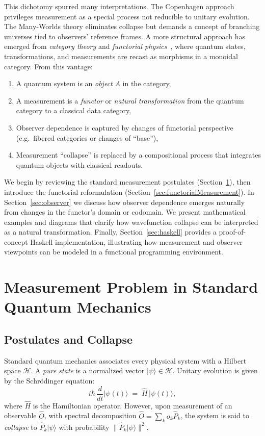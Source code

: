 \documentclass[12pt]{article}
\begin{document}
This dichotomy spurred many interpretations. The Copenhagen approach privileges measurement as a special process 
not reducible to unitary evolution. The Many-Worlds theory eliminates collapse but demands a concept of branching 
universes tied to observers' reference frames. A more structural approach has emerged from \emph{category theory} and 
\emph{functorial physics}~\cite{AbramskyCoecke, HeunenVicary}, where quantum states, transformations, and measurements 
are recast as morphisms in a monoidal category. From this vantage:
\begin{enumerate}[label=(\roman*)]
    \item A quantum system is an \emph{object} \(A\) in the category,
    \item A measurement is a \emph{functor} or \emph{natural transformation} from the quantum category to a classical data category,
    \item Observer dependence is captured by changes of functorial perspective (e.g.\ fibered categories or changes of ``base''),
    \item Measurement ``collapse'' is replaced by a compositional process that integrates quantum objects with classical readouts.
\end{enumerate}

We begin by reviewing the standard measurement postulates (Section~\ref{sec:measurementProblem}), 
then introduce the functorial reformulation (Section~\ref{sec:functorialMeasurement}). 
In Section~\ref{sec:observer} we discuss how observer dependence emerges naturally from changes in the functor's domain or codomain. 
We present mathematical examples and diagrams that clarify how wavefunction collapse can be interpreted as a natural transformation. 
Finally, Section~\ref{sec:haskell} provides a proof-of-concept Haskell implementation, illustrating how measurement 
and observer viewpoints can be modeled in a functional programming environment.

\section{Measurement Problem in Standard Quantum Mechanics}
\label{sec:measurementProblem}

\subsection{Postulates and Collapse}
Standard quantum mechanics associates every physical system with a Hilbert space \(\mathcal{H}\). 
A \emph{pure state} is a normalized vector \(\vert \psi \rangle \in \mathcal{H}\). Unitary evolution 
is given by the Schr\"odinger equation:
\begin{equation}
\label{eq:schrodinger}
i \hbar \,\frac{d}{dt} \vert \psi(t) \rangle \;=\; \hat{H} \,\vert \psi(t) \rangle,
\end{equation}
where \(\hat{H}\) is the Hamiltonian operator. However, upon measurement of an observable \(\hat{O}\), 
with spectral decomposition \(\hat{O} = \sum_k o_k \hat{P}_k\), the system is said to \emph{collapse} to 
\(\hat{P}_k \vert \psi \rangle\) with probability \(\|\hat{P}_k \vert \psi\rangle \|^2\).
\end{document}
